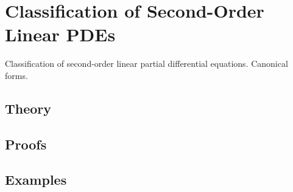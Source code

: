 
\section{Classification of Second-Order Linear PDEs}
\label{sec:2.1.01-pde-classification}

\begin{ticket}
Classification of second-order linear partial differential equations. Canonical forms.
\end{ticket}

\subsection*{Theory}

\subsection*{Proofs}

\subsection*{Examples}
